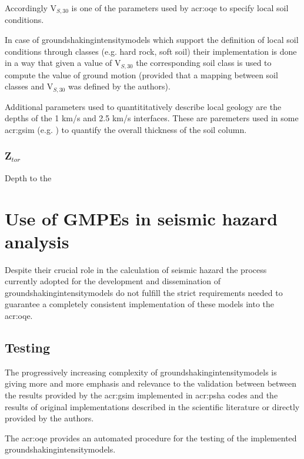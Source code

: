 Accordingly V$_{S,30}$ is one of the parameters used by \gls{acr:oqe} to 
specify local soil conditions.

In case of \glspl{groundshakingintensitymodel} which support the definition 
of local soil conditions through classes (e.g. hard rock, soft soil) their
implementation is done in a way that given a value of V$_{S,30}$ the
corresponding soil class is used to compute the value of ground motion 
(provided that a mapping between soil classes and V$_{S,30}$ was defined 
by the authors).

Additional parameters used to quantititatively describe local geology are 
the depths of the 1 km/s and 2.5 km/s interfaces. These are paremeters used
in some \gls{acr:gsim} (e.g. \cite{chiou2008;campbell2008}) to quantify the 
overall thickness of the soil column. 
%
\subsubsection{Z$_{tor}$}
Depth to the 

%
\section{Use of GMPEs in seismic hazard analysis}
% 
Despite their crucial role in the calculation of seismic hazard the process
currently adopted for the development and dissemination of
\glspl{groundshakingintensitymodel} do not fulfill the strict requirements
needed to guarantee a completely consistent implementation of these models into
the \gls{acr:oqe}.
%
\subsection{Testing}
%
The progressively increasing complexity of \glspl{groundshakingintensitymodel}
is giving more and more emphasis and relevance to the validation between 
between the results provided by the \gls{acr:gsim} implemented in
\gls{acr:psha} codes and the results of original implementations 
described in the scientific literature or directly provided by the authors.

The \gls{acr:oqe} provides an automated procedure for the testing of 
the implemented \glspl{groundshakingintensitymodel}. 
%
